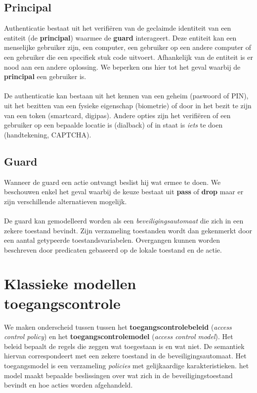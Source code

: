 \documentclass[../main.tex]{subfiles}
\begin{document}
\subsection{Principal}
Authenticatie bestaat uit het verifi\"eren van de geclaimde identiteit van een entiteit (de \textbf{principal}) waarmee de \textbf{guard} interageert. Deze entiteit kan een menselijke gebruiker zijn, een computer, een gebruiker op een andere computer of een gebruiker die een specifiek stuk code uitvoert. Afhankelijk van de entiteit is er nood aan een andere oplossing. We beperken ons hier tot het geval waarbij de \textbf{principal} een gebruiker is.
\\\\
De authenticatie kan bestaan uit het kennen van een geheim (paswoord of PIN), uit het bezitten van een fysieke eigenschap (biometrie) of door in het bezit te zijn van een token (smartcard, digipas). Andere opties zijn het verifi\"eren of een gebruiker op een bepaalde locatie is (dialback) of in staat is \textit{iets} te doen (handtekening, CAPTCHA).

\subsection{Guard}
Wanneer de guard een actie ontvangt beslist hij wat ermee te doen. We beschouwen enkel het geval waarbij de keuze bestaat uit \textbf{pass} of \textbf{drop} maar er zijn verschillende alternatieven mogelijk.
\\\\
De guard kan gemodelleerd worden als een \textit{beveiligingsautomaat} die zich in een zekere toestand bevindt. Zijn verzameling toestanden wordt dan gekenmerkt door een aantal getypeerde toestandsvariabelen. Overgangen kunnen worden beschreven door predicaten gebaseerd op de lokale toestand en de actie.


\section{Klassieke modellen toegangscontrole}
We maken onderscheid tussen tussen het \textbf{toegangscontrolebeleid} (\textit{access control policy}) en het \textbf{toegangscontrolemodel} (\textit{access control model}). Het beleid bepaalt de regels die zeggen wat toegestaan is en wat niet. De semantiek hiervan correspondeert met een zekere toestand in de  beveiligingsautomaat. Het toegangsmodel is een verzameling \textit{policies} met gelijkaardige karakteristieken. het model maakt bepaalde beslissingen over wat zich in de beveiligingstoestand bevindt en hoe acties worden afgehandeld.
\end{document}
